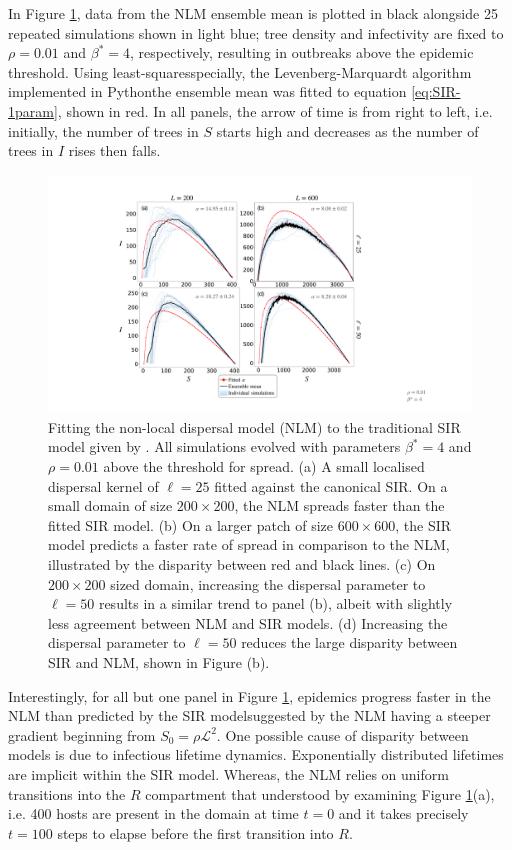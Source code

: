 In Figure \ref{fig:SIR-fitting}, data from the NLM ensemble mean is plotted in black alongside 25 repeated simulations shown in light blue; 
tree density and infectivity are fixed to $\rho=0.01$ and $\beta^*=4$, respectively, resulting in outbreaks above the epidemic threshold.
Using least-squares\textemdash specially, the Levenberg-Marquardt algorithm \cite{more1978levenberg} implemented in Python\textemdash the ensemble mean was fitted to equation \ref{eq:SIR-1param}, shown in red.
In all panels, the arrow of time is from right to left, i.e. initially, the number of trees in $S$ starts high and decreases as the number of trees in $I$ rises then falls.
 
 \begin{figure}
    \centering
    \includegraphics[scale=0.425]{chapter5/figures/fig2-sir-fitting-step.pdf}
    \caption{Fitting the non-local dispersal model (NLM) to the traditional SIR model given by \cite{kermack-model}. All simulations evolved with parameters $\beta^{*}=4$ and $\rho=0.01$ above the threshold for spread. (a) A small localised dispersal kernel of $\ell=25$ fitted against the canonical SIR. On a small domain of size $200\times 200$, the NLM spreads faster than the fitted SIR model. (b) On a larger patch of size $600\times 600$, the SIR model predicts a faster rate of spread in comparison to the NLM, illustrated by the disparity between red and black lines. (c) On $200\times 200$ sized domain, increasing the dispersal parameter to $\ell=50$ results in a similar trend to panel (b), albeit with slightly less agreement between NLM and SIR models. (d) Increasing the dispersal parameter to $\ell=50$ reduces the large disparity between SIR and NLM, shown in Figure (b).}
    \label{fig:SIR-fitting}
\end{figure}

Interestingly, for all but one panel in Figure \ref{fig:SIR-fitting}, epidemics progress faster in the NLM than predicted by the SIR model\textemdash suggested by the NLM having a steeper gradient beginning from $S_0=\rho\mathcal{L}^2$. 
One possible cause of disparity between models is due to infectious lifetime dynamics. 
Exponentially distributed lifetimes are implicit within the SIR model.
Whereas, the NLM relies on uniform transitions into the $R$ compartment that understood by examining Figure \ref{fig:SIR-fitting}(a), i.e. 400 hosts are present in the domain at time $t=0$ and it takes precisely $t=100$ steps to elapse before the first transition into $R$.

